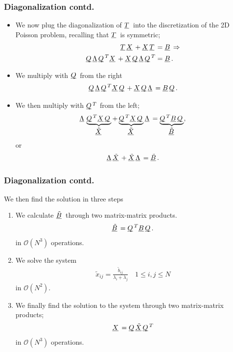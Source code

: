 \documentclass{beamer}
\newcommand{\ub}[1]{\underbar{$#1$}\,}
\begin{document}
\begin{frame}\frametitle{Diagonalization contd.}
  \begin{itemize}
    \item We now plug the diagonalization of $\ub{T}$ into the discretization
      of the 2D Poisson problem, recalling that $\ub{T}$ is symmetric;
      \[
        \begin{split}
          \ub{T}\ub{X} + \ub{X}\ub{T} &= \ub{B} \Rightarrow \\
          \ub{Q}\ub{\Lambda}\ub{Q}^T\ub{X} + \ub{X}\ub{Q}\ub{\Lambda}\ub{Q}^T &= \ub{B}.
        \end{split}
      \]
    \item We multiply with $\ub{Q}$ from the right
      \[
        \ub{Q}\ub{\Lambda}\ub{Q}^T\ub{X}\ub{Q} + \ub{X}\ub{Q}\ub{\Lambda} = \ub{B}\ub{Q}.
      \]
    \item We then multiply with $\ub{Q}^T$ from the left;
      \[
        \ub{\Lambda}\underbrace{\ub{Q}^T\ub{X}\ub{Q}}_{\ub{\tilde{X}}} + \underbrace{\ub{Q}^T\ub{X}\ub{Q}}_{\ub{\tilde{X}}}\ub{\Lambda} = \underbrace{\ub{Q}^T\ub{B}\ub{Q}}_{\ub{\tilde{B}}},
      \]
      or
      \[
        \ub{\Lambda}\ub{\tilde{X}} + \ub{\tilde{X}}\ub{\Lambda} = \ub{\tilde{B}}.
      \]
  \end{itemize}
\end{frame}
\begin{frame}\frametitle{Diagonalization contd.}
  We then find the solution in three steps
  \begin{enumerate}
    \item We calculate $\ub{\tilde{B}}$ through two matrix-matrix products.
      \[
        \ub{\tilde{B}} = \ub{Q}^T\ub{B}\ub{Q}.
      \]
      in $\mathcal{O}\left(N^3\right)$ operations.
    \item We solve the system
      \[
        \begin{split}
          \tilde{x}_{ij} = \frac{\tilde{b}_{ij}}{\lambda_i+\lambda_j}\quad 1 \leq i,j \leq N
        \end{split}
      \]
      in $\mathcal{O}\left(N^2\right)$.
    \item We finally find the solution to the system through two matrix-matrix products;
      \[
        \ub{X} = \ub{Q}\ub{\tilde{X}}\ub{Q}^T
      \]
      in $\mathcal{O}\left(N^3\right)$ operations.
  \end{enumerate}
\end{frame}
\end{document}
